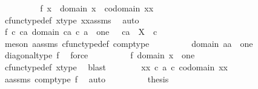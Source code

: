 \begin{isabellebody}
\ \ \ \ \ \ \isamarkupfalse%
\ \isamarkupfalse%
\ f{}{\isacharcolon}{\kern0pt}\ {\isachardoublequoteopen}x\ {\isacharcolon}{\kern0pt}\ domain\ x\ {\isasymrightarrow}\ codomain\ xx{\isachardoublequoteclose}\isanewline
\ \ \ \ \ \ \ \ \isamarkupfalse%
\ cfunc{\isacharunderscore}{\kern0pt}type{\isacharunderscore}{\kern0pt}def\ x{\isacharunderscore}{\kern0pt}type\ xx{\isacharunderscore}{\kern0pt}assms\ \isamarkupfalse%
\ auto\isanewline
\ \ \ \ \ \ \isamarkupfalse%
\ f{}{}{\isacharcolon}{\kern0pt}\ {\isachardoublequoteopen}{\isasymforall}c\ ca{\isachardot}{\kern0pt}\ domain\ {\isacharparenleft}{\kern0pt}ca\ {\isasymcirc}\isactrlsub c\ a{\isacharparenright}{\kern0pt}\ {\isacharequal}{\kern0pt}\ one\ {\isasymor}\ {\isasymnot}\ ca\ {\isacharcolon}{\kern0pt}\ X\ {\isasymrightarrow}\ c{\isachardoublequoteclose}\isanewline
\ \ \ \ \ \ \ \ \isamarkupfalse%
\ {\isacharparenleft}{\kern0pt}meson\ a{\isacharunderscore}{\kern0pt}assms\ cfunc{\isacharunderscore}{\kern0pt}type{\isacharunderscore}{\kern0pt}def\ comp{\isacharunderscore}{\kern0pt}type{\isacharparenright}{\kern0pt}\isanewline
\ \ \ \ \ \ \isamarkupfalse%
\ \isamarkupfalse%
\ {\isachardoublequoteopen}domain\ {\isasymlangle}a{\isacharcomma}{\kern0pt}a{\isasymrangle}\ {\isacharequal}{\kern0pt}\ one{\isachardoublequoteclose}\isanewline
\ \ \ \ \ \ \ \ \isamarkupfalse%
\ diagonal{\isacharunderscore}{\kern0pt}type\ f{}\ \isamarkupfalse%
\ force\isanewline
\ \ \ \ \ \ \isamarkupfalse%
\ \isamarkupfalse%
\ f{}{}{\isacharcolon}{\kern0pt}\ {\isachardoublequoteopen}domain\ x\ {\isacharequal}{\kern0pt}\ one{\isachardoublequoteclose}\isanewline
\ \ \ \ \ \ \ \ \isamarkupfalse%
\ cfunc{\isacharunderscore}{\kern0pt}type{\isacharunderscore}{\kern0pt}def\ x{\isacharunderscore}{\kern0pt}type\ \isamarkupfalse%
\ blast\isanewline
\ \ \ \ \ \ \isamarkupfalse%
\ {\isachardoublequoteopen}xx\ {\isasymcirc}\isactrlsub c\ a\ {\isasymin}\isactrlsub c\ codomain\ xx{\isachardoublequoteclose}\isanewline
\ \ \ \ \ \ \ \ \isamarkupfalse%
\ a{\isacharunderscore}{\kern0pt}assms\ comp{\isacharunderscore}{\kern0pt}type\ f{}\ \isamarkupfalse%
\ auto\isanewline
\ \ \ \ \ \ \isamarkupfalse%
\ \isamarkupfalse%
\ {\isacharquery}{\kern0pt}thesis\isanewline

\end{isabellebody}
